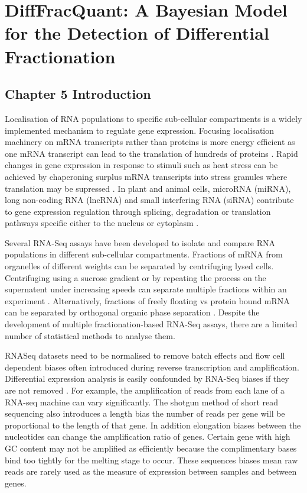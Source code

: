 \documentclass[../main.tex]{subfiles}
\begin{document}
\chapter{{DiffFracQuant: A Bayesian Model for the Detection of Differential Fractionation}}

\section{Chapter 5 Introduction}

Localisation of RNA populations to specific sub-cellular compartments is a widely implemented mechanism to regulate gene expression.
Focusing localisation machinery on mRNA transcripts rather than proteins is more energy efficient as one mRNA transcript can lead to the translation of hundreds of proteins \parencite{Chin2017}.
Rapid changes in gene expression in response to stimuli such as heat stress can be achieved by chaperoning surplus mRNA transcripts into stress granules where translation may be supressed \parencite{Anderson2009}.
In plant and animal cells, microRNA (miRNA), long non-coding RNA (lncRNA) and small interfering RNA (siRNA) contribute to gene expression regulation through splicing, degradation or translation pathways specific either to the nucleus or cytoplasm \parencite{Hombach2016}.

Several RNA-Seq assays have been developed to isolate and compare RNA populations in different sub-cellular compartments.
Fractions of mRNA from organelles of different weights can be separated by centrifuging lysed cells. 
Centrifuging using a sucrose gradient or by repeating the process on the supernatent under increasing speeds can separate multiple fractions within an experiment \parencite{Iserman2020, Dunham2012, Hu2017}.
Alternatively, fractions of freely floating vs protein bound mRNA can be separated by orthogonal organic phase separation \parencite{Queiroz2019}. 
Despite the development of multiple fractionation-based RNA-Seq assays, there are a limited number of statistical methods to analyse them.

RNASeq datasets need to be normalised to remove batch effects and flow cell dependent biases often introduced during reverse transcription and amplification. 
Differential expression analysis is easily confounded by RNA-Seq biases if they are not removed \parencite{Soneson2018}.
For example, the amplification of reads from each lane of a RNA-seq machine can vary significantly. 
The shotgun method of short read sequencing also introduces a length bias the number of reads per gene will be proportional to the length of that gene. 
In addition elongation biases between the nucleotides can change the amplification ratio of genes.
Certain gene with high GC content may not be amplified as efficiently because the complimentary bases bind too tightly for the melting stage to occur. 
These sequences biases mean raw reads are rarely used as the measure of expression between samples and between genes. 
\end{document}
